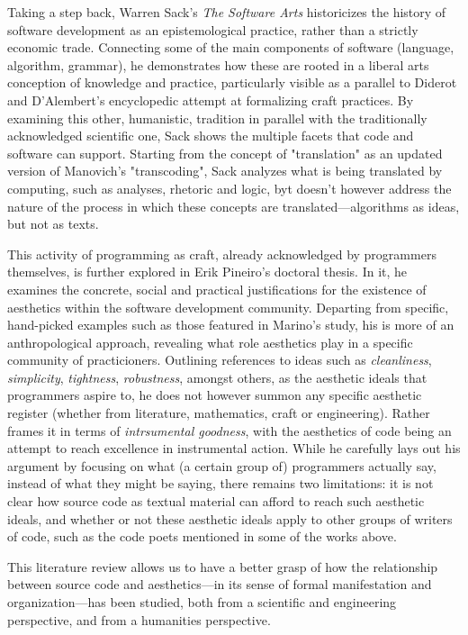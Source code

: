 Taking a step back, Warren Sack's \emph{The Software Arts}\cite{sack_software_2019} historicizes the history of software development as an epistemological practice, rather than a strictly economic trade. Connecting some of the main components of software (language, algorithm, grammar), he demonstrates how these are rooted in a liberal arts conception of knowledge and practice, particularly visible as a parallel to Diderot and D'Alembert's encyclopedic attempt at formalizing craft practices. By examining this other, humanistic, tradition in parallel with the traditionally acknowledged scientific one, Sack shows the multiple facets that code and software can support. Starting from the concept of "translation" as an updated version of Manovich's "transcoding", Sack analyzes what is being translated by computing, such as analyses, rhetoric and logic, byt doesn't however address the nature of the process in which these concepts are translated—algorithms as ideas, but not as texts.

This activity of programming as craft, already acknowledged by programmers themselves, is further explored in Erik Pineiro's doctoral thesis\cite{pineiro_aesthetics_2003}. In it, he examines the concrete, social and practical justifications for the existence of aesthetics within the software development community. Departing from specific, hand-picked examples such as those featured in Marino's study, his is more of an anthropological approach, revealing what role aesthetics play in a specific community of practicioners. Outlining references to ideas such as \emph{cleanliness}, \emph{simplicity}, \emph{tightness}, \emph{robustness}, amongst others, as the aesthetic ideals that programmers aspire to, he does not however summon any specific aesthetic register (whether from literature, mathematics, craft or engineering). Rather frames it in terms of \emph{intrsumental goodness}, with the aesthetics of code being an attempt to reach excellence in instrumental action. While he carefully lays out his argument by focusing on what (a certain group of) programmers actually say, instead of what they might be saying, there remains two limitations: it is not clear how source code as textual material can afford to reach such aesthetic ideals, and whether or not these aesthetic ideals apply to other groups of writers of code, such as the code poets mentioned in some of the works above.

\vspace*{1\baselineskip}

This literature review allows us to have a better grasp of how the relationship between source code and aesthetics—in its sense of formal manifestation and organization—has been studied, both from a scientific and engineering perspective, and from a humanities perspective.

